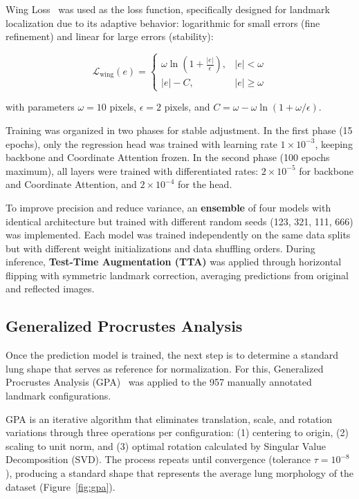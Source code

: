 \documentclass[applsci,article,submit,pdftex,moreauthors]{Definitions/mdpi}
\begin{document}
Wing Loss~\cite{feng2018wing} was used as the loss function, specifically designed for landmark localization due to its adaptive behavior: logarithmic for small errors (fine refinement) and linear for large errors (stability):

\begin{linenomath}
\begin{equation}
\mathcal{L}_{\mathrm{wing}}(e) =
\begin{cases}
\omega \ln\left(1 + \frac{|e|}{\epsilon}\right), & |e| < \omega \\
|e| - C, & |e| \geq \omega
\end{cases}
\end{equation}
\end{linenomath}

with parameters $\omega = 10$ pixels, $\epsilon = 2$ pixels, and $C = \omega - \omega \ln(1 + \omega/\epsilon)$.

Training was organized in two phases for stable adjustment. In the first phase (15 epochs), only the regression head was trained with learning rate $1 \times 10^{-3}$, keeping backbone and Coordinate Attention frozen. In the second phase (100 epochs maximum), all layers were trained with differentiated rates: $2 \times 10^{-5}$ for backbone and Coordinate Attention, and $2 \times 10^{-4}$ for the head.

To improve precision and reduce variance, an \textbf{ensemble} of four models with identical architecture but trained with different random seeds (123, 321, 111, 666) was implemented. Each model was trained independently on the same data splits but with different weight initializations and data shuffling orders. During inference, \textbf{Test-Time Augmentation (TTA)} was applied through horizontal flipping with symmetric landmark correction, averaging predictions from original and reflected images.

\subsection{Generalized Procrustes Analysis}

Once the prediction model is trained, the next step is to determine a standard lung shape that serves as reference for normalization. For this, Generalized Procrustes Analysis (GPA)~\cite{gower1975generalized} was applied to the 957 manually annotated landmark configurations.

GPA is an iterative algorithm that eliminates translation, scale, and rotation variations through three operations per configuration: (1) centering to origin, (2) scaling to unit norm, and (3) optimal rotation calculated by Singular Value Decomposition (SVD). The process repeats until convergence (tolerance $\tau = 10^{-8}$), producing a standard shape that represents the average lung morphology of the dataset (Figure~\ref{fig:gpa}).
\end{document}
